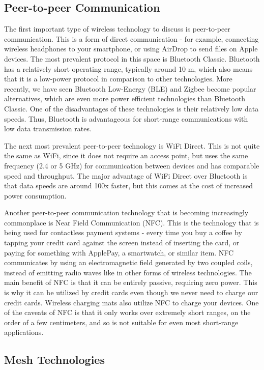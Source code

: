 {{{{{{{{{    \subsection{Peer-to-peer Communication}
    
    The first important type of wireless technology to discuss is peer-to-peer communication. This is a form of direct communication - for example, connecting wireless headphones to your smartphone, or using AirDrop to send files on Apple devices. The most prevalent protocol in this space is Bluetooth Classic. Bluetooth has a relatively short operating range, typically around 10 m, which also means that it is a low-power protocol in comparison to other technologies. More recently, we have seen Bluetooth Low-Energy (BLE) and Zigbee become popular alternatives, which are even more power efficient technologies than Bluetooth Classic. One of the disadvantages of these technologies is their relatively low data speeds. Thus, Bluetooth is advantageous for short-range communications with low data transmission rates.
    
    The next most prevalent peer-to-peer technology is WiFi Direct. This is not quite the same as WiFi, since it does not require an access point, but uses the same frequency (2.4 or 5 GHz) for communication between devices and has comparable speed and throughput. The major advantage of WiFi Direct over Bluetooth is that data speeds are around 100x faster, but this comes at the cost of increased power consumption.
    
    Another peer-to-peer communication technology that is becoming increasingly commonplace is Near Field Communication (NFC). This is the technology that is being used for contactless payment systems - every time you buy a coffee by tapping your credit card against the screen instead of inserting the card, or paying for something with ApplePay, a smartwatch, or similar item. NFC communicates by using an electromagnetic field generated by two coupled coils, instead of emitting radio waves like in other forms of wireless technologies. The main benefit of NFC is that it can be entirely passive, requiring zero power. This is why it can be utilized by credit cards even though we never need to charge our credit cards. Wireless charging mats also utilize NFC to charge your devices. One of the caveats of NFC is that it only works over extremely short ranges, on the order of a few centimeters, and so is not suitable for even most short-range applications.
    
    \subsection{Mesh Technologies}
    
}}}}}}}}}
